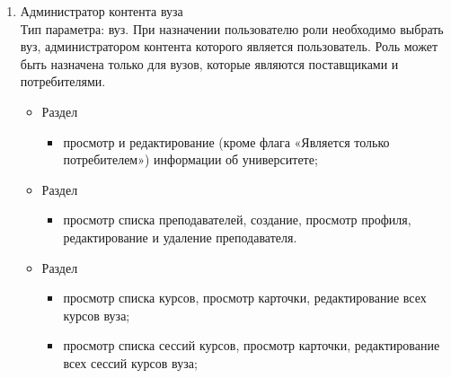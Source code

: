 \begin{enumerate}
\begin{itemize}
	\end{itemize}
	\item Администратор контента вуза\\
	Тип параметра: вуз. При назначении пользователю роли необходимо выбрать вуз, администратором контента которого является пользователь. Роль может быть назначена только для вузов, которые являются поставщиками и потребителями.
	\begin{itemize}
		\item Раздел 
		\begin{itemize}
			\item просмотр и редактирование (кроме флага «Является только потребителем») информации об университете;
		\end{itemize}			
		\item Раздел 
		\begin{itemize}
			\item просмотр списка преподавателей, создание, просмотр профиля, редактирование и удаление преподавателя.
		\end{itemize}			
		\item Раздел 
		\begin{itemize}
			\item просмотр списка курсов, просмотр карточки, редактирование  всех курсов вуза;
			\item просмотр списка сессий курсов, просмотр карточки, редактирование всех сессий курсов вуза;
		\end{itemize}
	\end{itemize}
	

\end{enumerate}
